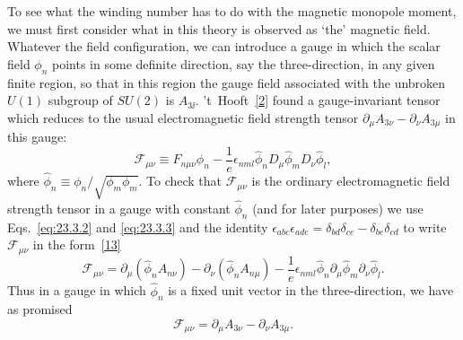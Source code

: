 To see what the winding number has to do with the magnetic monopole
moment, we must first consider what in this theory is observed as `the'
magnetic field. Whatever the field configuration, we can introduce a
gauge in which the scalar field $\phi_n$ points in some definite direction,
say the three-direction, in any given finite region, so that in this region
the gauge field associated with the unbroken $U(1)$ subgroup of $SU(2)$ is
$A_{3\ii}$. 't~Hooft~\hyperref[ch23-ref-2]{[2]} found a gauge-invariant
tensor which reduces to the usual electromagnetic field strength tensor
$\partial_\mu A_{3\nu}-\partial_\nu A_{3\mu}$ in this gauge:
\begin{equation}
 \mathcal F_{\mu\nu}\equiv
 F_{n\mu\nu}\hat\phi_n
 -\frac1e\epsilon_{nml}\hat\phi_n
 D_\mu\hat\phi_mD_\nu\hat\phi_l,
 \tag{23.3.5}\label{eq:23.3.5}
\end{equation}
where
$\hat\phi_n\equiv\phi_n/\sqrt{\phi_m\phi_m}$. To check that
$\mathcal F_{\mu\nu}$ is the ordinary electromagnetic field strength
tensor in a gauge with constant $\hat\phi_n$ (and for later purposes) we
use Eqs.~\eqref{eq:23.3.2} and \eqref{eq:23.3.3} and the identity
$\epsilon_{abc}\epsilon_{ade}
=\delta_{bd}\delta_{ce}-\delta_{be}\delta_{cd}$ to write
$\mathcal F_{\mu\nu}$ in the form~\hyperref[ch23-ref-13]{[13]}
\begin{equation}
 \mathcal F_{\mu\nu}
 =\partial_\mu(\hat\phi_nA_{n\nu})
 -\partial_\nu(\hat\phi_nA_{n\mu})
 -\frac1e\epsilon_{nml}\hat\phi_n
 \partial_\mu\hat\phi_m\partial_\nu\hat\phi_l.
 \tag{23.3.6}\label{eq:23.3.6}
\end{equation}
Thus in a gauge in which $\hat\phi_n$ is a fixed unit vector in the
three-direction, we have as promised
\[
 \mathcal F_{\mu\nu}
 =\partial_\mu A_{3\nu}-\partial_\nu A_{3\mu}.
\]

